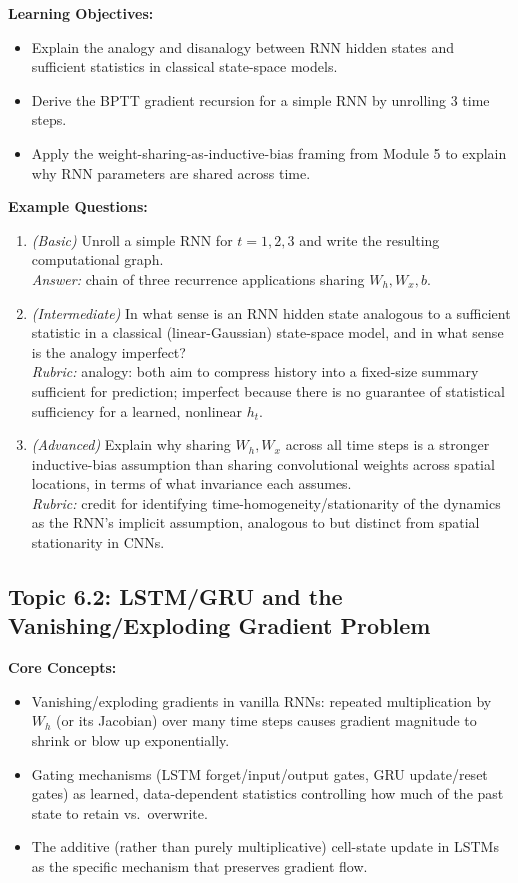 \documentclass[11pt]{article}
\begin{document}
\textbf{Learning Objectives:}
\begin{itemize}
  \item Explain the analogy and disanalogy between RNN hidden states and sufficient statistics in classical state-space models.
  \item Derive the BPTT gradient recursion for a simple RNN by unrolling 3 time steps.
  \item Apply the weight-sharing-as-inductive-bias framing from Module 5 to explain why RNN parameters are shared across time.
\end{itemize}

\textbf{Example Questions:}
\begin{enumerate}
  \item \textit{(Basic)} Unroll a simple RNN for $t=1,2,3$ and write the resulting computational graph. \\
  \textit{Answer:} chain of three recurrence applications sharing $W_h, W_x, b$.
  \item \textit{(Intermediate)} In what sense is an RNN hidden state analogous to a sufficient statistic in a classical (linear-Gaussian) state-space model, and in what sense is the analogy imperfect? \\
  \textit{Rubric:} analogy: both aim to compress history into a fixed-size summary sufficient for prediction; imperfect because there is no guarantee of statistical sufficiency for a learned, nonlinear $h_t$.
  \item \textit{(Advanced)} Explain why sharing $W_h, W_x$ across all time steps is a stronger inductive-bias assumption than sharing convolutional weights across spatial locations, in terms of what invariance each assumes. \\
  \textit{Rubric:} credit for identifying time-homogeneity/stationarity of the dynamics as the RNN's implicit assumption, analogous to but distinct from spatial stationarity in CNNs.
\end{enumerate}

\subsection{Topic 6.2: LSTM/GRU and the Vanishing/Exploding Gradient Problem}

\textbf{Core Concepts:}
\begin{itemize}
  \item Vanishing/exploding gradients in vanilla RNNs: repeated multiplication by $W_h$ (or its Jacobian) over many time steps causes gradient magnitude to shrink or blow up exponentially.
  \item Gating mechanisms (LSTM forget/input/output gates, GRU update/reset gates) as learned, data-dependent statistics controlling how much of the past state to retain vs.\ overwrite.
  \item The additive (rather than purely multiplicative) cell-state update in LSTMs as the specific mechanism that preserves gradient flow.
\end{itemize}
\end{document}
